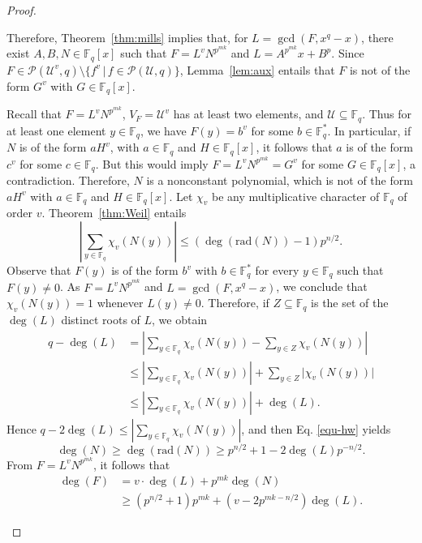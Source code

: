 \documentclass[11pt]{amsart}
\newcommand{\rad}{\mathrm{rad}}
\newcommand{\F}{\mathbb{F}}
\newcommand{\pp}{\mathcal P}
\theoremstyle{definition}
\theoremstyle{remark}
\begin{document}
\begin{proof}
\begin{itemize}
 Therefore, Theorem~\ref{thm:mills} implies that, for $L=\gcd(F,x^q-x)$, there exist $A, B, N\in \F_q[x]$ such that $F=L^vN^{p^{mk}}$ and $L=A^{p^{mk}}x+B^p$. Since $F\in \mathcal P(\mathcal U^v, q)\setminus \{f^v\,|\, f\in \pp(\mathcal U, q)\}$, Lemma~\ref{lem:aux} entails that $F$ is not of the form $G^v$ with $G\in \F_q[x]$. 

Recall that $F=L^{v}N^{p^{mk}}$, $V_F=\mathcal U^v$ has at least two elements, and $\mathcal U\subseteq \F_q$. Thus  for at least one element $y\in \F_q$,  we have   $F(y)=b^v$ for some $b\in \F_{q}^*$. In particular, if $N$ is of the form $aH^v$,  with $a\in \F_q$ and $H\in \F_q[x]$, it follows that $a$ is of the form $c^v$ for some $c\in \F_q$. But this would imply  $F=L^{v}N^{p^{mk}}=G^v$ for some $G\in \F_q[x]$, a contradiction. Therefore, $N$ is a nonconstant polynomial, which  is not of the form $aH^v$ with $a\in \F_q$ and $H\in \F_q[x]$. Let $\chi_v$ be any multiplicative character of $\F_{q}$ of order $v$. Theorem~\ref{thm:Weil} entails 
\begin{equation}\label{equ-hw}
\left|\sum_{y\in \F_q}\chi_v(N(y))\right|\le (\deg(\rad(N))-1)p^{n/2}.
\end{equation}
Observe that $F(y)$ is of the form $b^v$ with $b\in \F_q^*$ for every $y\in \F_q$ such that $F(y)\ne 0$. As $F=L^{v}N^{p^{mk}}$ and $L=\gcd(F, x^q-x)$, we conclude that $\chi_v(N(y))=1$ whenever $L(y)\ne 0$. Therefore, if $Z\subseteq \F_q$ is  the set of the $\deg(L)$ distinct roots of $L$, we obtain
\begin{align*}
q - \deg(L) &= \left\lvert \sum_{y\in \F_q} \chi_v(N(y)) - \sum_{y\in Z} \chi_v(N(y)) \right\rvert \\
            &\le \left\lvert \sum_{y\in \F_q } \chi_v(N(y)) \right\rvert + \sum_{y\in Z} \lvert \chi_v(N(y)) \rvert \\
            &\le \left\lvert \sum_{y\in \F_q } \chi_v(N(y)) \right\rvert + \deg(L).
\end{align*}
Hence $ q-2\deg(L)\leq \left|    \sum_{y\in \F_q}\chi_v(N(y))\right|$, and then Eq. \eqref{equ-hw} yields 
\begin{equation}\label{rad1}
\deg(N)\geq \deg(\rad(N))\ge p^{n/2}+1-2\deg(L) p^{-n/2}.
\end{equation}
From $F=L^vN^{p^{mk}}$, it follows  that 
\begin{align*}
\deg(F) &= v \cdot \deg(L) + p^{mk} \deg(N) \\
        &\ge (p^{n/2} + 1)p^{mk} +  (v - 2p^{mk - n/2})\deg(L) .
\end{align*}

\end{itemize}
\end{proof}
\end{document}
